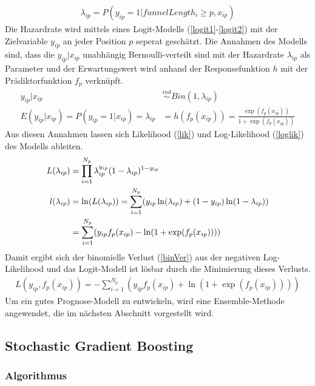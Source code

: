 \begin{align}
	\lambda_{ip} = P(y_{ip}=1|funnelLength_i \geq p, x_{ip}) \label{haz}
\end{align}
Die Hazardrate wird mittels eines Logit-Modells (\ref{logit1}-\ref{logit2}) mit der Zielvariable $y_{ip}$ an jeder Position $p$ seperat geschätzt. Die Annahmen des Modells sind, dass die $y_{ip}|x_{ip}$ unabhängig Bernoulli-verteilt sind mit der Hazardrate $\lambda_{ip}$ als Parameter und der Erwartungswert wird anhand der Responsefunktion $h$ mit der Prädiktorfunktion $f_{p}$ verknüpft.
\begin{align}
	y_{ip}|x_{ip} &\stackrel{ind}{\sim} Bin(1, \lambda_{ip}) \label{logit1} \\
	E(y_{ip}|x_{ip}) = P(y_{ip} = 1|x_{ip}) = \lambda_{ip} &= h(f_{p}(x_{ip})) = \frac{\exp(f_{p}(x_{ip}))}{1+\exp(f_{p}(x_{ip}))}\label{logit2}
\end{align}
Aus diesen Annahmen lassen sich Likelihood (\ref{lik}) und Log-Likelihood (\ref{loglik}) des Modells ableiten.
\begin{align}
	L(\lambda_{ip}) &= \prod_{i=1}^{N_p} \lambda_{ip}^{y_{ip}} (1-\lambda_{ip})^{1-y_{ip}} \label{lik} \\
	l(\lambda_{ip}) &= \ln(L(\lambda_{ip})) = \sum_{i=1}^{N_p} (y_{ip} \ln(\lambda_{ip}) + (1-y_{ip}) \ln(1-\lambda_{ip})) \notag \\
	&= \sum_{i=1}^{N_p} (y_{ip} f_p(x_{ip}) - \ln(1+\exp(f_p(x_{ip})))) \label{loglik}
\end{align}
Damit ergibt sich der binomielle Verlust (\ref{binVer}) aus der negativen Log-Likelihood und das Logit-Modell ist lösbar durch die Minimierung dieses Verlusts.
\begin{align}
	L(y_{ip},f_p(x_{ip})) = -\sum_{i=1}^{N_p} (y_{ip} f_p(x_{ip}) + \ln(1+\exp(f_p(x_{ip}))))\label{binVer}
\end{align}
Um ein gutes Prognose-Modell zu entwickeln, wird eine Ensemble-Methode angewendet, die im nächsten Abschnitt vorgestellt wird.

\subsection{Stochastic Gradient Boosting}\label{secModel2}

\subsubsection*{Algorithmus}

